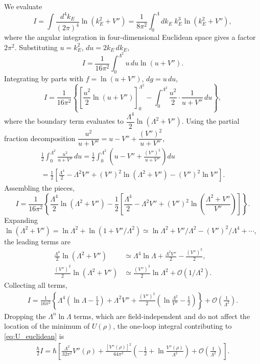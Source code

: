 We evaluate
\begin{equation}
	I = \int\frac{d^4k_E}{(2\pi)^4}\ln(k_E^2+V'')
	= \frac{1}{8\pi^2}\int_0^{\Lambda}dk_E\;k_E^3\ln(k_E^2+V''),
\end{equation}
where the angular integration in four-dimensional Euclidean space gives
a factor $2\pi^2$. Substituting $u=k_E^2$, $du=2k_E\,dk_E$,
\begin{equation}
	I = \frac{1}{16\pi^2}\int_0^{\Lambda^2}u\,du\ln(u+V'').
\end{equation}
Integrating by parts with $f=\ln(u+V'')$, $dg=u\,du$,
\begin{equation}
	I = \frac{1}{16\pi^2}\left\{
	\left[\frac{u^2}{2}\ln(u+V'')\right]_0^{\Lambda^2}
	- \int_0^{\Lambda^2}\frac{u^2}{2}\cdot\frac{1}{u+V''}\,du
	\right\},
\end{equation}
where the boundary term evaluates to
$\dfrac{\Lambda^4}{2}\ln(\Lambda^2+V'')$. Using the partial fraction
decomposition $\dfrac{u^2}{u+V''} = u-V''+\dfrac{(V'')^2}{u+V''}$,
\begin{multline}
	\frac{1}{2}\int_0^{\Lambda^2}\frac{u^2}{u+V''}\,du
	= \frac{1}{2}\int_0^{\Lambda^2}
	\left(u-V''+\frac{(V'')^2}{u+V''}\right)du \\
	= \frac{1}{2}\left[
		\frac{\Lambda^4}{2} - \Lambda^2 V''
		+ (V'')^2\ln(\Lambda^2+V'') - (V'')^2\ln V''
		\right].
\end{multline}
Assembling the pieces,
\begin{equation}
	I = \frac{1}{16\pi^2}\left\{
	\frac{\Lambda^4}{2}\ln(\Lambda^2+V'')
	- \frac{1}{2}\left[
		\frac{\Lambda^4}{2} - \Lambda^2 V''
		+ (V'')^2\ln\!\left(\frac{\Lambda^2+V''}{V''}\right)
		\right]
	\right\}.
\end{equation}
Expanding $\ln(\Lambda^2+V'') = \ln\Lambda^2+\ln(1+V''/\Lambda^2)
	\simeq \ln\Lambda^2 + V''/\Lambda^2 - (V'')^2/\Lambda^4 + \cdots$, the
leading terms are
\begin{align}
	\frac{\Lambda^4}{2}\ln(\Lambda^2+V'')
	 & \simeq \Lambda^4\ln\Lambda + \frac{\Lambda^2 V''}{2}
	- \frac{(V'')^2}{2},                                    \\
	\frac{(V'')^2}{2}\ln(\Lambda^2+V'')
	 & \simeq \frac{(V'')^2}{2}\ln\Lambda^2
	+ \mathcal{O}(1/\Lambda^2).
\end{align}
Collecting all terms,
\begin{multline}
	I = \frac{1}{16\pi^2}\left\{
	\Lambda^4\!\left(\ln\Lambda-\frac{1}{4}\right)
	+ \Lambda^2 V''
	+ \frac{(V'')^2}{2}\left(\ln\frac{\Lambda^2}{V''}-\frac{1}{2}\right)
	\right\}
	+ \mathcal{O}\!\left(\frac{1}{\Lambda^2}\right).
\end{multline}
Dropping the $\Lambda^n\ln\Lambda$ terms, which are field-independent and
do not affect the location of the minimum of $U(\rho)$, the one-loop
integral contributing to \eqref{eq:U_euclidean} is
\begin{multline}
	\frac{\hbar}{2}I
	= \hbar\left[
		\frac{\Lambda^2}{32\pi^2}V''(\rho)
		+ \frac{[V''(\rho)]^2}{64\pi^2}
		\left(-\frac{1}{2}+\ln\frac{V''(\rho)}{\Lambda^2}\right)
		+ \mathcal{O}\!\left(\frac{1}{\Lambda^2}\right)
		\right].
\end{multline}
